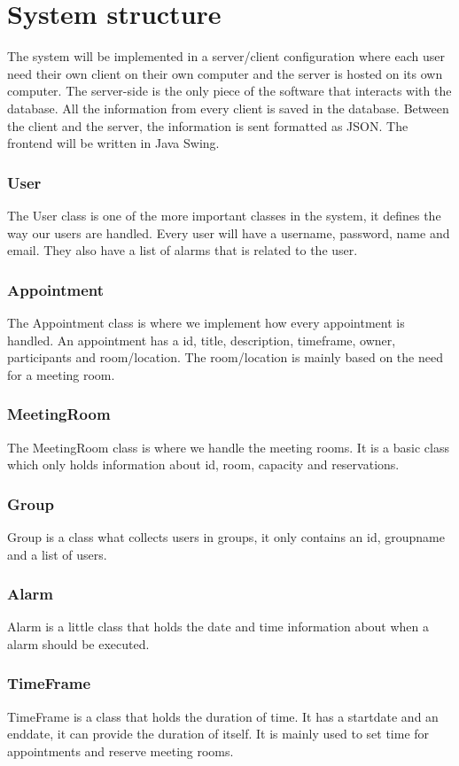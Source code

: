 \documentclass[a4paper, 10pt]{article}
\begin{document}
\newpage

\section{System structure}
The system will be implemented in a server/client configuration where each user need their own client on their own computer and the server is hosted on its own computer. The server-side is the only piece of the software that interacts with the database. All the information from every client is saved in the database. Between the client and the server, the information is sent formatted as JSON. The frontend will be written in Java Swing.

\subsubsection{User}
The User class is one of the more important classes in the system, it defines the way our users are handled. Every user will have a username, password, name and email. They also have a list of alarms that is related to the user.

\subsubsection{Appointment}
The Appointment class is where we implement how every appointment is handled. An appointment has a id, title, description, timeframe, owner, participants and room/location. The room/location is mainly based on the need for a meeting room.

\subsubsection{MeetingRoom}
The MeetingRoom class is where we handle the meeting rooms. It is a basic class which only holds information about id, room, capacity and reservations.

\subsubsection{Group}
Group is a class what collects users in groups, it only contains an id, groupname and a list of users.

\subsubsection{Alarm}
Alarm is a little class that holds the date and time information about when a alarm should be executed.

\subsubsection{TimeFrame}
TimeFrame is a class that holds the duration of time. It has a startdate and an enddate, it can provide the duration of itself. It is mainly used to set time for appointments and reserve meeting rooms.
\end{document}
